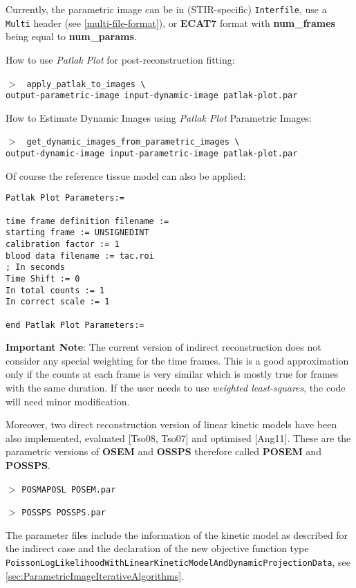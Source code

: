 \documentclass{article}
\newcommand{\cmdline}[1]{\par \noindent $>$ \texttt{#1}\par}
\begin{document}
Currently, the parametric image
can be in (STIR-specific) \texttt{Interfile}, use a \texttt{Multi} header (see \ref{multi-file-format}), or
\textbf{ECAT7} format with \textbf{num\_frames} being equal to \textbf{num\_params}.

How to use \textit{Patlak Plot} for post-reconstruction fitting:

\cmdline{%
apply\_patlak\_to\_images \textbackslash \\
  output-parametric-image input-dynamic-image patlak-plot.par}

How to Estimate Dynamic Images using \textit{Patlak Plot} Parametric Images:
\cmdline{%
get\_dynamic\_images\_from\_parametric\_images \textbackslash \\
   output-dynamic-image input-parametric-image patlak-plot.par}

Of course the reference tissue model can also be applied: 

\begin{verbatim}
Patlak Plot Parameters:=

time frame definition filename := 
starting frame := UNSIGNEDINT
calibration factor := 1
blood data filename := tac.roi
; In seconds
Time Shift := 0
In total counts := 1
In correct scale := 1

end Patlak Plot Parameters:=
\end{verbatim}

\textbf{Important Note}: The current version of indirect reconstruction does not consider any special weighting for the time frames. This is a good approximation only if the counts at each frame is very similar which is mostly true for frames with the same duration. If the user needs to use  \textit{weighted least-squares}, the code will need minor modification.

Moreover, two direct reconstruction version of linear kinetic models have been also implemented, evaluated [Tso08, Tso07] and optimised [Ang11]. These are the parametric versions of \textbf{OSEM} and \textbf{OSSPS} therefore called \textbf{POSEM} and \textbf{POSSPS}.

\cmdline{POSMAPOSL POSEM.par}
\cmdline{POSSPS POSSPS.par}


The parameter files include the information of the kinetic model as described for the indirect case and the declaration of the new objective function type\\
\texttt{PoissonLogLikelihoodWithLinearKineticModelAndDynamicProjectionData}, see \ref{sec:ParametricImageIterativeAlgorithms}.
\end{document}
